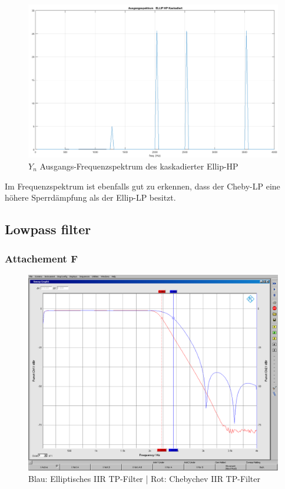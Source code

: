\begin{figure}[h]
\centering
\includegraphics[width=0.7\linewidth]{Bilder/Attachment_E_ELLIP_HP_Spektrum}
\caption{$Y_{n}$ Ausgangs-Frequenzspektrum des kaskadierter Ellip-HP}
\label{fig:Attachment_E_ELLIP_HP_Spektrum}
\end{figure}

\noindent Im Frequenzspektrum ist ebenfalls gut zu erkennen, dass der Cheby-LP eine höhere Sperrdämpfung als der Ellip-LP besitzt.

\clearpage

\subsection{Lowpass filter}
\subsubsection{Attachement F}

	\begin{figure}[h]
		\centering
		\includegraphics[width=0.8\linewidth]{Bilder/EllipCheby}
		\caption{Blau: Elliptisches IIR TP-Filter | Rot: Chebychev IIR TP-Filter}
		\label{fig:EllipCheby}
	\end{figure}
	
